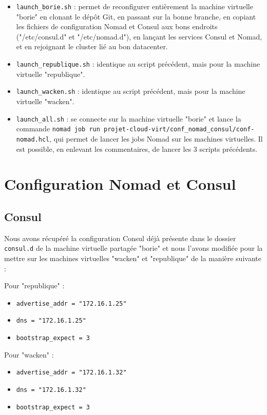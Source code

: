 \documentclass{report}
\begin{document}
\begin{itemize}
    \item \texttt{launch\_borie.sh} : permet de reconfigurer entièrement la machine virtuelle "borie" en clonant le dépôt Git, en passant sur la bonne branche, en copiant les fichiers de configuration Nomad et Consul aux bons endroits ("/etc/consul.d" et "/etc/nomad.d"), en lançant les services Consul et Nomad, et en rejoignant le cluster lié au bon datacenter.
    \item \texttt{launch\_republique.sh} : identique au script précédent, mais pour la machine virtuelle "republique".
    \item \texttt{launch\_wacken.sh} : identique au script précédent, mais pour la machine virtuelle "wacken".
    \item \texttt{launch\_all.sh} : se connecte sur la machine virtuelle "borie" et lance la commande \texttt{nomad job run projet-cloud-virt/conf\_nomad\_consul/conf-nomad.hcl}, qui permet de lancer les jobs Nomad sur les machines virtuelles. Il est possible, en enlevant les commentaires, de lancer les 3 scripts précédents.
\end{itemize}

\newpage

\chapter{Configuration Nomad et Consul}

\section{Consul}
Nous avons récupéré la configuration Consul déjà présente dans le dossier \texttt{consul.d} de la machine virtuelle partagée "borie" et nous l'avons modifiée pour la mettre sur les machines virtuelles "wacken" et "republique" de la manière suivante :

Pour "republique" :
\begin{itemize}
    \item \texttt{advertise\_addr = "172.16.1.25"}
    \item \texttt{dns = "172.16.1.25"}
    \item \texttt{bootstrap\_expect = 3}
\end{itemize}

Pour "wacken" :
\begin{itemize}
    \item \texttt{advertise\_addr = "172.16.1.32"}
    \item \texttt{dns = "172.16.1.32"}
    \item \texttt{bootstrap\_expect = 3}
\end{itemize}
\end{document}
